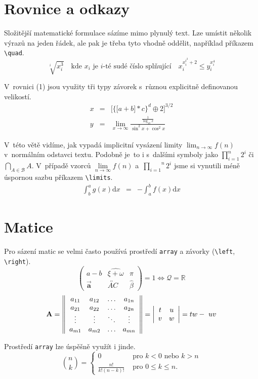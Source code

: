 \documentclass[a4paper, 11pt, twocolumn]{article}
\begin{document}
  
\section{Rovnice a odkazy}
Složitější matematické formulace sázíme mimo plynulý
text. Lze umístit několik výrazů na jeden řádek, ale pak je
třeba tyto vhodně oddělit, například příkazem \verb|\quad|.\vfill
$$ \sqrt[i]{x_{i}^{3}}\quad \textrm{kde } x_{i} \textrm{ je }{i} \textrm{-té sudé číslo splňující}\quad x_{i}^{x_{i}^{i^{2}}+2} \leq y_{i}^{x_{i}^{4}}$$
\par
V~rovnici (1) jsou využity tři typy závorek s~různou
explicitně definovanou velikostí.
\begin{eqnarray}\label{term1}
x& = &\bigg[\Big\{\big[a+b\big] * c\Big\}^{d} \oplus 2\bigg]^{3 / 2}\\
y& = &\lim _{x \rightarrow \infty} \frac{\frac{1}{\log _{10} x}}{\sin ^{2} x+\cos ^{2} x}\nonumber
\end{eqnarray}
\par
V~této větě vidíme, jak vypadá implicitní vysázení limity $\lim _{n \rightarrow \infty} f(n)$ v~normálním odstavci textu. Podobně je~to i s~dalšími symboly jako $\prod_{i=1}^{n} 2^{i}$ či $\bigcap_{A \in \mathcal{B}} A$. V~případě vzorců $\lim\limits_{n\to\infty}f(n)$ a~$\overset{n}{\underset{i=1}{\prod}} 2^i$ jsme si vynutili méně úspornou sazbu příkazem  \verb|\limits|.
\begin{eqnarray}\label{term2}
\int_{b}^{a} g(x) \mathrm{d} x& = &-\int_{a}^{b} f(x) \mathrm{d} x
\end{eqnarray}
  \section{Matice}
  Pro sázení matic se velmi často používá prostředí  \verb|array|
a závorky (\verb|\left|, \verb|\right|).
$$
\left(\begin{array}{ccc}
a-b & \widehat{\xi+\omega} & \pi \\
\vec{\mathbf{a}} & \overleftrightarrow{A C} & \hat{\beta}
\end{array}\right)=1 \Longleftrightarrow \mathcal{Q}=\mathbb{R}
$$
 $$
\mathbf{A}=\left\|\begin{array}{cccc}
a_{11} & a_{12} & \ldots & a_{1 n} \\
a_{21} & a_{22} & \ldots & a_{2 n} \\
\vdots & \vdots & \ddots & \vdots \\
a_{m 1} & a_{m 2} & \ldots & a_{m n}
\end{array}\right\|=\left|\begin{array}{cc}
t & u \\
v & w
\end{array}\right|=t w \--\ uv
$$
 \par
 Prostředí \verb|array| lze úspěšně využít i jinde.
 $$
\binom{n}{k} = \left\{\begin{array}{cl}
0 & \text { pro } k<0 \text { nebo } k>n \\
\frac{n !}{k !(n-k) !} & \text { pro } 0 \leq k \leq n.
\end{array}\right.
$$
  

  
\end{document}
